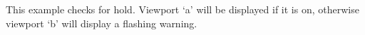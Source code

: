 \begin{example}
\end{example}
This example checks for hold. Viewport `a' will be displayed if it is on,
otherwise viewport `b' will display a flashing warning.
